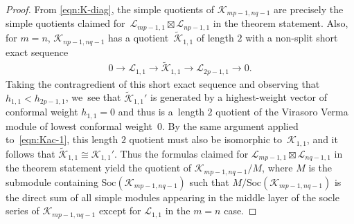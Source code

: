 \documentclass[pdftex]{sigma}
\numberwithin{equation}{section}
\theoremstyle{definition}
\begin{document}
\begin{proof}
From \eqref{eqn:K-diag}, the simple quotients of $\mathcal{K}_{mp-1,nq-1}$ are precisely the simple quotients claimed for~$\mathcal{L}_{mp-1,1}\boxtimes\mathcal{L}_{np-1,1}$ in the theorem statement. Also, for $m=n$, $\mathcal{K}_{np-1,nq-1}$ has a quotient~$\widetilde{\mathcal{K}}_{1,1}$ of length $2$ with a non-split short exact sequence
\begin{gather*}
0\longrightarrow\mathcal{L}_{1,1}\longrightarrow\widetilde{\mathcal{K}}_{1,1}\longrightarrow\mathcal{L}_{2p-1,1}\longrightarrow 0.
\end{gather*}
Taking the contragredient of this short exact sequence and observing that $h_{1,1}<h_{2p-1,1}$, we~see that $\widetilde{\mathcal{K}}_{1,1}'$ is generated by a highest-weight vector of conformal weight $h_{1,1}=0$ and thus is a~length $2$ quotient of the Virasoro Verma module of lowest conformal weight~$0$. By the same argument applied to~\eqref{eqn:Kac-1}, this length $2$ quotient must also be isomorphic to~$\mathcal{K}_{1,1}$, and it follows that $\widetilde{\mathcal{K}}_{1,1}\cong\mathcal{K}_{1,1}'$. Thus the formulas claimed for $\mathcal{L}_{mp-1,1}\boxtimes\mathcal{L}_{nq-1,1}$ in the theorem statement yield the quotient of $\mathcal{K}_{mp-1,nq-1}/M$, where $M$ is the submodule containing $\mathrm{Soc}(\mathcal{K}_{mp-1,nq-1})$ such that $M/\mathrm{Soc}(\mathcal{K}_{mp-1,nq-1})$ is the direct sum of all simple modules appearing in the middle layer of the socle series of $\mathcal{K}_{mp-1,nq-1}$ except for $\mathcal{L}_{1,1}$ in the $m=n$ case.


\end{proof}
\end{document}
